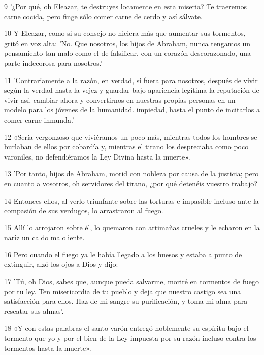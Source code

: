 \par 9 '¿Por qué, oh Eleazar, te destruyes locamente en esta miseria? Te traeremos carne cocida, pero finge sólo comer carne de cerdo y así sálvate.

\par 10 Y Eleazar, como si su consejo no hiciera más que aumentar sus tormentos, gritó en voz alta: 'No. Que nosotros, los hijos de Abraham, nunca tengamos un pensamiento tan malo como el de falsificar, con un corazón descorazonado, una parte indecorosa para nosotros.'

\par 11 'Contrariamente a la razón, en verdad, si fuera para nosotros, después de vivir según la verdad hasta la vejez y guardar bajo apariencia legítima la reputación de vivir así, cambiar ahora y convertirnos en nuestras propias personas en un modelo para los jóvenes de la humanidad. impiedad, hasta el punto de incitarlos a comer carne inmunda.'

\par 12 «Sería vergonzoso que viviéramos un poco más, mientras todos los hombres se burlaban de ellos por cobardía y, mientras el tirano los despreciaba como poco varoniles, no defendiéramos la Ley Divina hasta la muerte».

\par 13 'Por tanto, hijos de Abraham, morid con nobleza por causa de la justicia; pero en cuanto a vosotros, oh servidores del tirano, ¿por qué detenéis vuestro trabajo?

\par 14 Entonces ellos, al verlo triunfante sobre las torturas e impasible incluso ante la compasión de sus verdugos, lo arrastraron al fuego.

\par 15 Allí lo arrojaron sobre él, lo quemaron con artimañas crueles y le echaron en la nariz un caldo maloliente.

\par 16 Pero cuando el fuego ya le había llegado a los huesos y estaba a punto de extinguir, alzó los ojos a Dios y dijo:

\par 17 'Tú, oh Dios, sabes que, aunque pueda salvarme, moriré en tormentos de fuego por tu ley. Ten misericordia de tu pueblo y deja que nuestro castigo sea una satisfacción para ellos. Haz de mi sangre su purificación, y toma mi alma para rescatar sus almas'.

\par 18 «Y con estas palabras el santo varón entregó noblemente su espíritu bajo el tormento que yo y por el bien de la Ley impuesta por su razón incluso contra los tormentos hasta la muerte».

